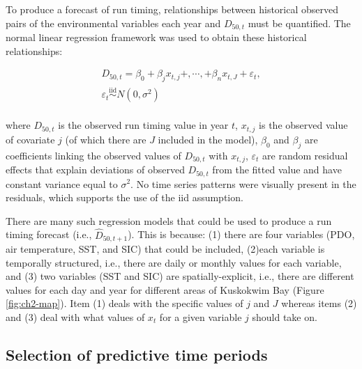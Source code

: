 \documentclass[12pt,]{book}
\theoremstyle{definition}
\theoremstyle{definition}
\theoremstyle{definition}
\theoremstyle{remark}
\begin{document}
\noindent
To produce a forecast of run timing, relationships between historical
observed pairs of the environmental variables each year and \(D_{50,t}\)
must be quantified. The normal linear regression framework was used to
obtain these historical relationships:

\begin{equation}
  \begin{split}
    D_{50,t} = \beta_0 + \beta_j x_{t,j} +, \cdots ,+ \beta_n x_{t,J} + \varepsilon_t, \\
    \varepsilon_t \stackrel{\text{iid}}{\sim} N(0, \sigma^2) \\
  \end{split}
\label{eq:lin-reg}
\end{equation}

\noindent
where \(D_{50,t}\) is the observed run timing value in year \(t\),
\(x_{t,j}\) is the observed value of covariate \(j\) (of which there are
\(J\) included in the model), \(\beta_0\) and \(\beta_j\) are
coefficients linking the observed values of \(D_{50,t}\) with
\(x_{t,j}\), \(\varepsilon_t\) are random residual effects that explain
deviations of observed \(D_{50,t}\) from the fitted value and have
constant variance equal to \(\sigma^2\). No time series patterns were
visually present in the residuals, which supports the use of the iid
assumption.

There are many such regression models that could be used to produce a
run timing forecast (i.e., \(\hat{D}_{50,t+1}\)). This is because: (1)
there are four variables (PDO, air temperature, SST, and SIC) that could
be included, (2)each variable is temporally structured, i.e., there are
daily or monthly values for each variable, and (3) two variables (SST
and SIC) are spatially-explicit, i.e., there are different values for
each day and year for different areas of Kuskokwim Bay (Figure
\ref{fig:ch2-map}). Item (1) deals with the specific values of \(j\) and
\(J\) whereas items (2) and (3) deal with what values of \(x_{t}\) for a
given variable \(j\) should take on.

\subsection{Selection of predictive time periods}\label{clim-windows}
\end{document}
